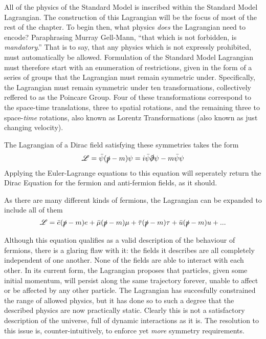     All of the physics of the Standard Model is inscribed within the Standard Model Lagrangian.
    The construction of this Lagrangian will be the focus of most of the rest of the chapter.
    To begin then, what physics \textit{does} the Lagrangian need to encode?
    Paraphrasing Murray Gell-Mann, ``that which is not forbidden, is \textit{mandatory}.''
    That is to say, that any physics which is not expressly prohibited, must automatically be allowed.
    Formulation of the Standard Model Lagrangian must therefore start with an enumeration of restrictions,
        given in the form of a series of groups that the Lagrangian must remain symmetric under.
    Specifically, the Lagrangian must remain symmetric under ten transformations,
        collectively reffered to as the Poincare Group.
    Four of these transformations correspond to the space-time translations,
        three to spatial rotations, and the remaining three to space-\textit{time} rotations,
        also known as Lorentz Transformations (also known as just changing velocity).

    The Lagrangian of a Dirac field satisfying these symmetries takes the form
    \begin{equation}
        \mathscr{L} = \bar{\psi} (\slashed{p} - m) \psi = i \bar{\psi} \slashed{\partial} \psi - m \bar{\psi} \psi
    \end{equation}
    Applying the Euler-Lagrange equations to this equation will seperately return the Dirac Equation
        for the fermion and anti-fermion fields, as it should.

    As there are many different kinds of fermions, the Lagrangian can be expanded to include all of them
    \begin{equation}
        \mathscr{L} = \bar{e} (\slashed{p} - m) e
        + \bar{\mu} (\slashed{p} - m) \mu
        + \bar{\tau} (\slashed{p} - m) \tau
        + \bar{u} (\slashed{p} - m) u
        + ...
    \end{equation}

    Although this equation qualifies as a valid description of the behaviour of fermions,
        there is a glaring flaw with it: the fields it describes are all completely independent of one another.
    None of the fields are able to interact with each other.
    In its current form, the Lagrangian proposes that particles, given some initial momentum,
        will persist along the same trajectory forever, unable to affect or be affected by any other particle.
    The Lagrangian has succesfully constrained the range of allowed physics,
        but it has done so to such a degree that the described physics are now practically static.
    Clearly this is not a satisfactory description of the universe, full of dynamic interactions as it is.
    The resolution to this issue is, counter-intuitively, to enforce yet \textit{more} symmetry requirements.



